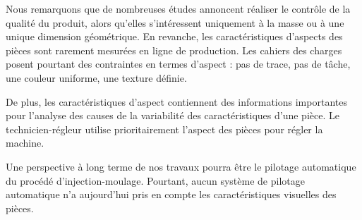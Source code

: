 Nous remarquons que de nombreuses études annoncent réaliser le contrôle de la qualité du produit, alors qu'elles s'intéressent uniquement à la masse ou à une unique dimension géométrique.
En revanche, les caractéristiques d'aspects des pièces sont rarement mesurées en ligne de production.
Les cahiers des charges posent pourtant des contraintes en termes d'aspect : pas de trace, pas de tâche, une couleur uniforme, une texture définie.

De plus, les caractéristiques d'aspect contiennent des informations importantes pour l'analyse des causes de la variabilité des caractéristiques d'une pièce. %
Le technicien-régleur utilise prioritairement l'aspect des pièces pour régler la machine.

Une perspective à long terme de nos travaux pourra être le pilotage automatique du procédé d'injection-moulage.
Pourtant, aucun système de pilotage automatique n'a aujourd'hui pris en compte les caractéristiques visuelles des pièces.


